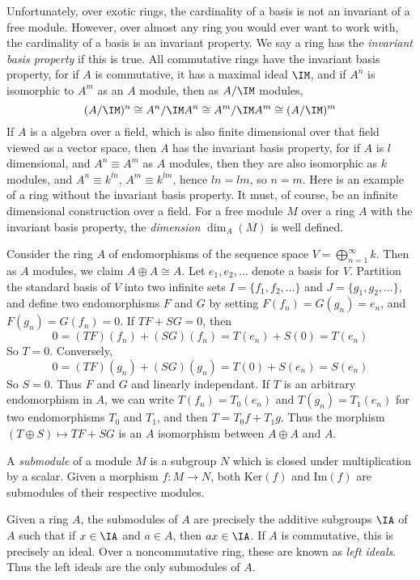 Unfortunately, over exotic rings, the cardinality of a basis is not an invariant of a free module. However, over almost any ring you would ever want to work with, the cardinality of a basis is an invariant property. We say a ring has the \emph{invariant basis property} if this is true. All commutative rings have the invariant basis property, for if $A$ is commutative, it has a maximal ideal $\IM$, and if $A^n$ is isomorphic to $A^m$ as an $A$ module, then as $A/\IM$ modules,
%
\[ (A/\IM)^n \cong A^n / \IM A^n \cong A^m/\IM A^m \cong (A/\IM)^m  \]
%
If $A$ is a algebra over a field, which is also finite dimensional over that field viewed as a vector space, then $A$ has the invariant basis property, for if $A$ is $l$ dimensional, and $A^n \equiv A^m$ as $A$ modules, then they are also isomorphic as $k$ modules, and $A^n \equiv k^{ln}$, $A^m \equiv k^{lm}$, hence $ln = lm$, so $n = m$. Here is an example of a ring without the invariant basis property. It must, of course, be an infinite dimensional construction over a field. For a free module $M$ over a ring $A$ with the invariant basis property, the \emph{dimension} $\dim_A(M)$ is well defined.

\begin{example}
    Consider the ring $A$ of endomorphisms of the sequence space $V = \bigoplus_{n = 1}^\infty k$. Then as $A$ modules, we claim $A \oplus A \cong A$. Let $e_1, e_2, \dots$ denote a basis for $V$. Partition the standard basis of $V$ into two infinite sets $I = \{ f_1, f_2, \dots \}$ and $J = \{ g_1, g_2, \dots \}$, and define two endomorphisms $F$ and $G$ by setting $F(f_n) = G(g_n) = e_n$, and $F(g_n) = G(f_n) = 0$. If $TF + SG = 0$, then
    \[ 0 = (TF)(f_n) + (SG)(f_n) = T(e_n) + S(0) = T(e_n) \]
    So $T = 0$. Conversely,
    \[ 0 = (TF)(g_n) + (SG)(g_n) = T(0) + S(e_n) = S(e_n) \]
    So $S = 0$. Thus $F$ and $G$ and linearly independant. If $T$ is an arbitrary endomorphism in $A$, we can write $T(f_n) = T_0(e_n)$ and $T(g_n) = T_1(e_n)$ for two endomorphisms $T_0$ and $T_1$, and then $T = T_0 f + T_1 g$. Thus the morphism $(T \oplus S) \mapsto TF + SG$ is an $A$ isomorphism between $A \oplus A$ and $A$. 
\end{example}

A \emph{submodule} of a module $M$ is a subgroup $N$ which is closed under multiplication by a scalar. Given a morphism $f: M \to N$, both $\text{Ker}(f)$ and $\text{Im}(f)$ are submodules of their respective modules.

\begin{example}
    Given a ring $A$, the submodules of $A$ are precisely the additive subgroups $\IA$ of $A$ such that if $x \in \IA$ and $a \in A$, then $ax \in \IA$. If $A$ is commutative, this is precisely an ideal. Over a noncommutative ring, these are known as \emph{left ideals}. Thus the left ideals are the only submodules of $A$.
\end{example}

